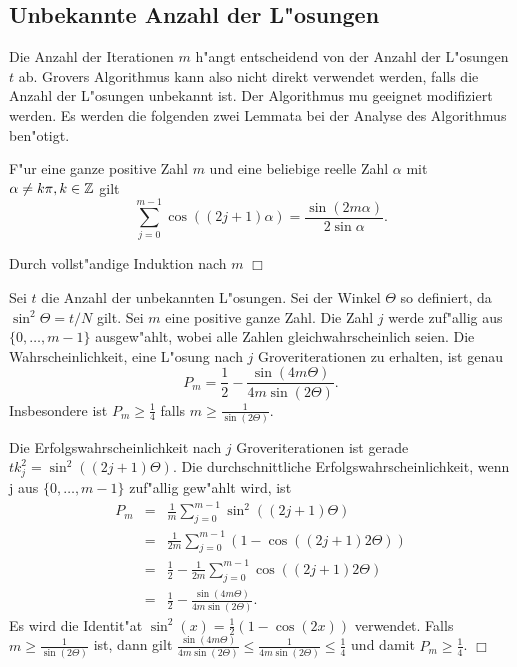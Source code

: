        \subsection{Unbekannte Anzahl der L"osungen} 
         Die Anzahl der Iterationen $m$ h"angt entscheidend von der Anzahl der L"osungen $t$ ab. Grovers Algorithmus kann also nicht direkt verwendet  
         werden, falls die Anzahl der L"osungen unbekannt ist. Der Algorithmus mu\3 geeignet modifiziert werden. Es werden die folgenden zwei Lemmata
         bei der Analyse des Algorithmus ben"otigt.
         \begin{lemma} F"ur eine ganze positive Zahl $m$ und eine beliebige reelle Zahl $\alpha$ mit $\alpha \neq k\pi, k\in\mathbb{Z}$ gilt
           $$ \sum_{j=0}^{m-1} \cos\left(\left( 2j+1\right) \alpha\right) = \frac{\sin\left( 2m\alpha\right)}{2\sin \alpha}. $$ 
         \end{lemma} 
         \beweis Durch vollst"andige Induktion nach $m$ \hfill $\Box$
         \begin{lemma} 
           Sei $t$ die Anzahl der unbekannten L"osungen. Sei der Winkel $\Theta$ so definiert, da\3 $\sin^2\Theta = t/N$ gilt. Sei $m$ eine positive  
           ganze Zahl. Die Zahl $j$ werde zuf"allig aus $\{ 0,\ldots, m-1\}$ ausgew"ahlt, wobei alle Zahlen gleichwahrscheinlich seien. Die Wahrscheinlichkeit, eine 
           L"osung nach $j$ Groveriterationen zu erhalten, ist genau 
           $$ P_m = \frac{1}{2} - \frac{\sin(4m\Theta)}{4m\sin(2\Theta)}. $$ 
           Insbesondere ist $P_m \ge \frac{1}{4}$ falls $m \ge \frac{1}{\sin(2\Theta)}$. 
         \end{lemma} 
         \beweis 
           Die Erfolgswahrscheinlichkeit nach $j$ Groveriterationen ist gerade $tk_j^2 = \sin^2((2j+1)\Theta)$. Die durchschnittliche  
           Erfolgswahrscheinlichkeit, wenn j aus $\{0,\ldots,m-1\}$ zuf"allig gew"ahlt wird, ist 
           \begin{eqnarray*} 
              P_m & = & \frac{1}{m} \sum_{j=0}^{m-1} \sin^2((2j+1)\Theta) \\
                  & = & \frac{1}{2m} \sum_{j=0}^{m-1} \left( 1-\cos((2j+1)2\Theta)\right) \\ 
                  & = & \frac{1}{2} - \frac{1}{2m} \sum_{j=0}^{m-1} \cos((2j+1)2\Theta) \\ 
                  & = & \frac{1}{2} - \frac{\sin(4m\Theta)}{4m\sin(2\Theta)}.  
           \end{eqnarray*} 
           Es wird die Identit"at $\sin^2(x)=\frac{1}{2}(1-\cos(2x))$ verwendet.
           Falls $m \ge \frac{1}{\sin(2\Theta)}$ ist, dann gilt $\frac{\sin(4m\Theta)}{4m\sin(2\Theta)} \le \frac{1}{4m\sin(2\Theta)} \le \frac{1}{4}$ und  
           damit $P_m \ge \frac{1}{4}$. \hfill $\Box$


